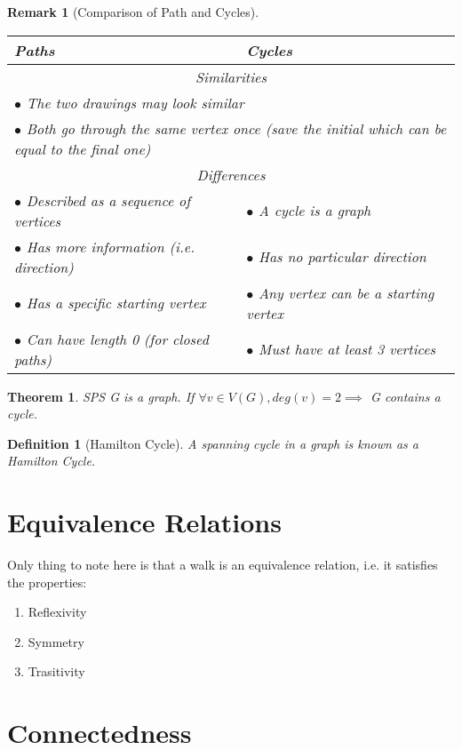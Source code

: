 \documentclass[11pt, oneside]{book}
\theoremstyle{break}
\newtheorem{thm}{Theorem}[section]
\newtheorem{defn}{Definition}[section]
\newtheorem*{remark}{Remark}
\begin{document}
\begin{remark}[Comparison of Path and Cycles]
	\mbox{}\\[-2ex]
	\begin{tabular}{l | l}
		Paths											&			Cycles \\
		\hline
		\multicolumn{2}{c}{Similarities} \\
		\hline
		\multicolumn{2}{l}{$\bullet$ The two drawings may look similar} \\
		\multicolumn{2}{l}{$\bullet$ Both go through the same vertex once (save the initial which can be equal to the final one)} \\
		\hline
		\multicolumn{2}{c}{Differences} \\
		\hline
		$\bullet$ Described as a sequence of vertices 	&	$\bullet$ A cycle is a graph \\
		$\bullet$ Has more information (i.e. direction) &	$\bullet$ Has no particular direction \\
		$\bullet$ Has a specific starting vertex		&	$\bullet$ Any vertex can be a starting vertex \\
		$\bullet$ Can have length 0 (for closed paths)	&	$\bullet$ Must have at least 3 vertices \\

	\end{tabular}
\end{remark}

\begin{thm}
	SPS G is a graph. If $\forall v \in V(G), deg(v) = 2 \implies$ G contains a cycle.
\end{thm}

\begin{defn}[Hamilton Cycle]
	A spanning cycle in a graph is known as a Hamilton Cycle.
\end{defn}


\section{Equivalence Relations}

Only thing to note here is that a walk is an equivalence relation, i.e. it satisfies the properties:
\begin{enumerate}
	\item Reflexivity
	\item Symmetry
	\item Trasitivity
\end{enumerate}


\section{Connectedness}
\end{document}
